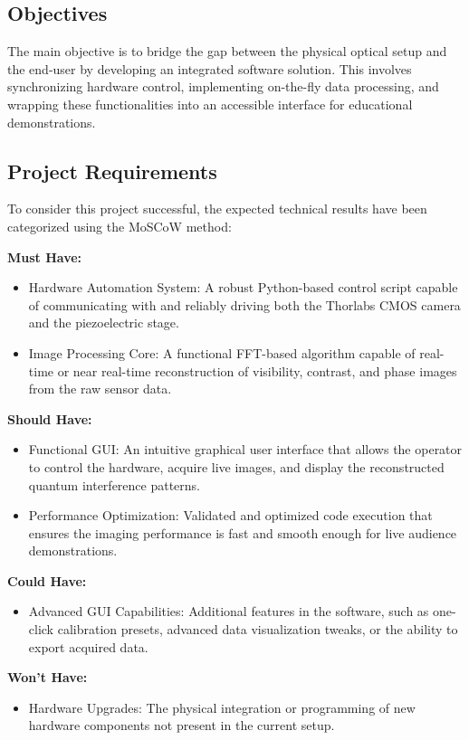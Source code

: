 \documentclass[12pt,a4paper]{article}
\begin{document}
\subsection{Objectives}
The main objective is to bridge the gap between the physical optical setup and the end-user by developing an integrated software solution. This involves synchronizing hardware control, implementing on-the-fly data processing, and wrapping these functionalities into an accessible interface for educational demonstrations.

\subsection{Project Requirements}
To consider this project successful, the expected technical results have been categorized using the MoSCoW method:

\textbf{Must Have:}
\begin{itemize}
    \item Hardware Automation System: A robust Python-based control script capable of communicating with and reliably driving both the Thorlabs \ac{CMOS} camera and the piezoelectric stage.
    \item Image Processing Core: A functional \ac{FFT}-based algorithm capable of real-time or near real-time reconstruction of visibility, contrast, and phase images from the raw sensor data.
\end{itemize}

\textbf{Should Have:}
\begin{itemize}
    \item Functional \ac{GUI}: An intuitive graphical user interface that allows the operator to control the hardware, acquire live images, and display the reconstructed quantum interference patterns.
    \item Performance Optimization: Validated and optimized code execution that ensures the imaging performance is fast and smooth enough for live audience demonstrations.
\end{itemize}

\textbf{Could Have:}
\begin{itemize}
    \item Advanced \ac{GUI} Capabilities: Additional features in the software, such as one-click calibration presets, advanced data visualization tweaks, or the ability to export acquired data.
\end{itemize}

\textbf{Won't Have:}
\begin{itemize}
    \item Hardware Upgrades: The physical integration or programming of new hardware components not present in the current setup.
 \end{itemize}
\end{document}
